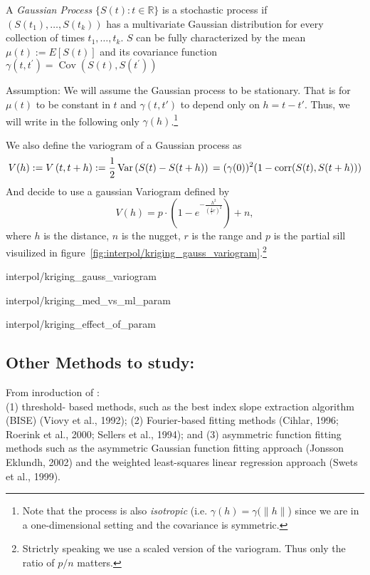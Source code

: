 A \textit{Gaussian Process} $\{S(t) : t\in \mathbb R\} $ is a stochastic process if $(S(t_1),\dots,S(t_k))$ has a multivariate Gaussian distribution for every collection of times ${t_1, \dots , t_k}$.
$S$ can be fully characterized by the mean $\mu(t):=E[S(t)]$ and its covariance function $\gamma\left(t, t^{\prime}\right)=\operatorname{Cov}\left(S(t), S\left(t^{\prime}\right)\right)$

Assumption:
We will assume the Gaussian process to be stationary. That is for $\mu(t)$ to be constant in $t$ and $\gamma(t,t')$ to depend only on $h=t-t'$. Thus, we will write in the following only $\gamma(h)$.\footnote{Note that the process is also \textit{isotropic} (i.e. $\gamma(h)=\gamma(\|h\|$) since we are in a one-dimensional setting and the covariance is symmetric.}


We also define the variogram of a Gaussian process as
$$V(h):=V\left(t, t+h\right):=\frac{1}{2} \operatorname{Var}\left(S(t)-S(t+h)\right)\\ %
    =(\gamma(0))^2(1-\operatorname{corr}(S(t),S(t+h)))
$$
And decide to use a gaussian Variogram defined by
$$V(h) = p \cdot\left(1-e^{-\frac{h^{2}}{\left(\frac{4}{7} r\right)^{2}}}\right)+n,$$
where $h$ is the distance, $n$ is the nugget, $r$ is the range and $p$ is the partial sill visuilized in figure~\ref{fig:interpol/kriging_gauss_variogram}.\footnote{Strictrly speaking we use a scaled version of the variogram. Thus only the ratio of $p/n$ matters.}
\begin{my_figure}{interpol/kriging_gauss_variogram}
    \caption{Gaussian Variogram with nugget=1, partial sill=3, range=55}
    \label{fig:interpol/kriging_gauss_variogram}
\end{my_figure}

\begin{my_figure}{interpol/kriging_med_vs_ml_param}
\end{my_figure}
\begin{my_figure}{interpol/kriging_effect_of_param}
\end{my_figure}

\subsection{Other Methods to study:}
From inroduction of \cite{chenSimpleMethodReconstructing2004a}:\\
(1) threshold-
based methods, such as the best index slope extraction
algorithm (BISE) (Viovy et al., 1992); (2) Fourier-based
fitting methods (Cihlar, 1996; Roerink et al., 2000; Sellers
et al., 1994); and (3) asymmetric function fitting methods
such as the asymmetric Gaussian function fitting approach
(Jonsson Eklundh, 2002) and the weighted least-squares
linear regression approach (Swets et al., 1999).
